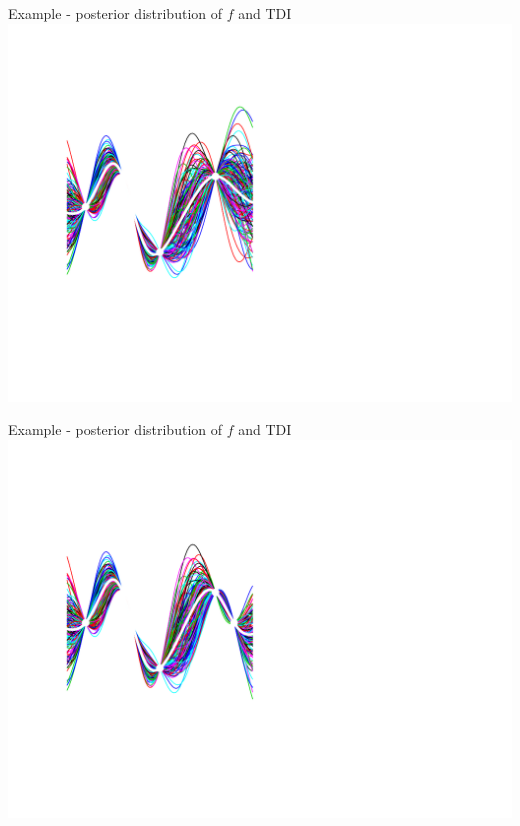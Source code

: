 \documentclass[ignorenonframetext,xcolor=pdflatex,table,dvipsnames,serif]{beamer}
\begin{document}
\begin{frame}{Example - posterior distribution of $f$ and TDI}
  \center\includegraphics[scale=0.5]{probAni05}
\end{frame}

\begin{frame}{Example - posterior distribution of $f$ and TDI}
  \center\includegraphics[scale=0.5]{probAni06}
\end{frame}
\end{document}
